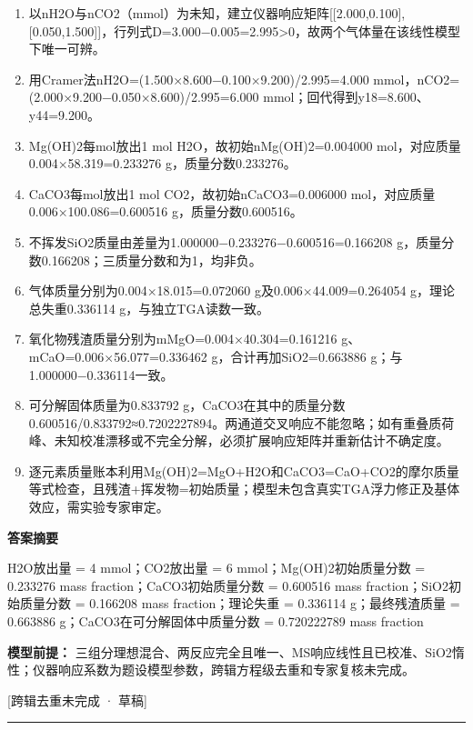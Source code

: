 \documentclass[UTF8,11pt,a4paper]{ctexart}
\begin{document}
\begin{enumerate}
\item 以nH2O与nCO2（mmol）为未知，建立仪器响应矩阵[[2.000,0.100],[0.050,1.500]]，行列式D=3.000−0.005=2.995>0，故两个气体量在该线性模型下唯一可辨。
\item 用Cramer法nH2O=(1.500×8.600−0.100×9.200)/2.995=4.000 mmol，nCO2=(2.000×9.200−0.050×8.600)/2.995=6.000 mmol；回代得到y18=8.600、y44=9.200。
\item Mg(OH)2每mol放出1 mol H2O，故初始nMg(OH)2=0.004000 mol，对应质量0.004×58.319=0.233276 g，质量分数0.233276。
\item CaCO3每mol放出1 mol CO2，故初始nCaCO3=0.006000 mol，对应质量0.006×100.086=0.600516 g，质量分数0.600516。
\item 不挥发SiO2质量由差量为1.000000−0.233276−0.600516=0.166208 g，质量分数0.166208；三质量分数和为1，均非负。
\item 气体质量分别为0.004×18.015=0.072060 g及0.006×44.009=0.264054 g，理论总失重0.336114 g，与独立TGA读数一致。
\item 氧化物残渣质量分别为mMgO=0.004×40.304=0.161216 g、mCaO=0.006×56.077=0.336462 g，合计再加SiO2=0.663886 g；与1.000000−0.336114一致。
\item 可分解固体质量为0.833792 g，CaCO3在其中的质量分数0.600516/0.833792≈0.7202227894。两通道交叉响应不能忽略；如有重叠质荷峰、未知校准漂移或不完全分解，必须扩展响应矩阵并重新估计不确定度。
\item 逐元素质量账本利用Mg(OH)2=MgO+H2O和CaCO3=CaO+CO2的摩尔质量等式检查，且残渣+挥发物=初始质量；模型未包含真实TGA浮力修正及基体效应，需实验专家审定。
\end{enumerate}
\noindent\textbf{答案摘要}\par
H2O放出量 = 4 mmol；CO2放出量 = 6 mmol；Mg(OH)2初始质量分数 = 0.233276 mass fraction；CaCO3初始质量分数 = 0.600516 mass fraction；SiO2初始质量分数 = 0.166208 mass fraction；理论失重 = 0.336114 g；最终残渣质量 = 0.663886 g；CaCO3在可分解固体中质量分数 = 0.720222789 mass fraction\par
\noindent\textbf{模型前提：}
三组分理想混合、两反应完全且唯一、MS响应线性且已校准、SiO2惰性；仪器响应系数为题设模型参数，跨辑方程级去重和专家复核未完成。\par
\noindent\textcolor{red!65!black}{[跨辑去重未完成 · 草稿]} \par
\medskip\hrule\medskip
{}
\end{document}
